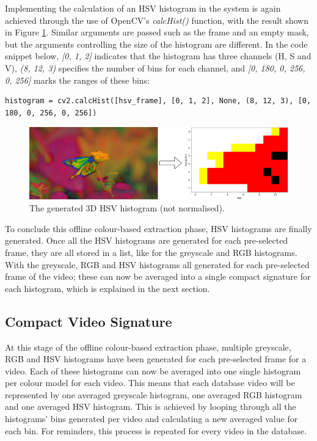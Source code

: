 Implementing the calculation of an HSV histogram in the system is again achieved through the use of OpenCV's \textit{calcHist()} function, with the result shown in Figure \ref{fig:implementation-hsv_not_normalised}. Similar arguments are passed such as the frame and an empty mask, but the arguments controlling the size of the histogram are different. In the code snippet below, \textit{[0, 1, 2]} indicates that the histogram has three channels (H, S and V), \textit{(8, 12, 3)} specifies the number of bins for each channel, and \textit{[0, 180, 0, 256, 0, 256]} marks the ranges of these bins:

\begin{lstlisting}
histogram = cv2.calcHist([hsv_frame], [0, 1, 2], None, (8, 12, 3), [0, 180, 0, 256, 0, 256])
\end{lstlisting}

\begin{figure}[h] 
\centerline{\includegraphics[width=\textwidth]{figures/implementation/hsv_not_normalised.png}}
\caption{\label{fig:implementation-hsv_not_normalised}The generated 3D HSV histogram (not normalised).}
\end{figure}

To conclude this offline colour-based extraction phase, HSV histograms are finally generated. Once all the HSV histograms are generated for each pre-selected frame, they are all stored in a list, like for the greyscale and RGB histograms. With the greyscale, RGB and HSV histograms all generated for each pre-selected frame of the video; these can now be averaged into a single compact signature for each histogram, which is explained in the next section.


\subsection{Compact Video Signature}
\label{sec:implementation-compact-video-signature}

At this stage of the offline colour-based extraction phase, multiple greyscale, RGB and HSV histograms have been generated for each pre-selected frame for a video. Each of these histograms can now be averaged into one single histogram per colour model for each video. This means that each database video will be represented by one averaged greyscale histogram, one averaged RGB histogram and one averaged HSV histogram. This is achieved by looping through all the histograms' bins generated per video and calculating a new averaged value for each bin. For reminders, this process is repeated for every video in the database.\\

